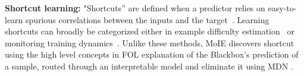 \textbf{Shortcut learning:}
"Shortcuts'' are defined when a predictor relies on easy-to-learn spurious correlations between the inputs and the target~\cite{geirhos2020shortcut}. Learning shortcuts can broadly be categorized either in example difficulty estimation~\cite{lalor2018understanding, hooker2019compressed, agarwal2022estimating} or monitoring training dynamics~\cite{hu2020surprising, feng2021phases, rabanser2022selective}. Unlike these methods, MoIE discovers shortcut using the high level concepts in FOL explanation of the Blackbox's prediction of a sample, routed through an interpretable model and eliminate it using MDN \cite{lu2021metadata}.